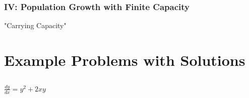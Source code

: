 \documentclass{article}
\begin{document}
\subsubsection*{IV: Population Growth with Finite Capacity}
"Carrying Capacity"













\pagebreak
\section{Example Problems with Solutions}
\subsection{}
$\frac{dy}{dx}=y^2+2xy$
\end{document}
